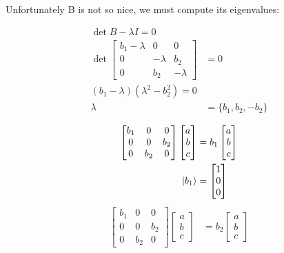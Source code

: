 \documentclass[12pt]{article}
\begin{document}
Unfortunately B is not so nice, we must compute its eigenvalues:

\begin{align*}
    \det{B - \lambda I} = 0 \\
    \det{
    \begin{bmatrix}
        b_1 -\lambda & 0 & 0 \\
        0 & -\lambda & b_2 \\
        0 & b_2 & -\lambda
    \end{bmatrix}} &= 0 \\
    (b_1 - \lambda)(\lambda^2 - b_2^2) = 0 \\
    \lambda &= \{ b_1, b_2, -b_2 \} \\
\end{align*}\begin{align*}
    \begin{bmatrix}
        b_1 & 0 & 0 \\
        0 & 0 & b_2 \\
        0 & b_2 & 0
    \end{bmatrix}
    \begin{bmatrix}a\\b\\c\end{bmatrix} 
        &= b_1\begin{bmatrix}a\\b\\c\end{bmatrix} \\
    \Ket{b_1} &= \begin{bmatrix}1\\0\\0\end{bmatrix} \\
\end{align*}\begin{align*}
    \begin{bmatrix}
        b_1 & 0 & 0 \\
        0 & 0 & b_2 \\
        0 & b_2 & 0
    \end{bmatrix}
    \begin{bmatrix}a\\b\\c\end{bmatrix} 
        &= b_2\begin{bmatrix}a\\b\\c\end{bmatrix} \\

\end{align*}
\end{document}
